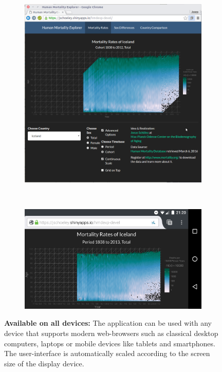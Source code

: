 \documentclass[
  12pt
]{scrartcl}
\begin{document}
\begin{figure}[!htb]
  \begin{subfigure}[t]{0.5\textwidth}
    \centering
    \includegraphics[width = \textwidth]{./fig/hmd_screen_wide.png}
    \label{fig:mx_wide}
    \end{subfigure}%
  ~
    \begin{subfigure}[t]{0.5\textwidth}
    \includegraphics[width = \textwidth]{./fig/hmd_screen_phone.png}
    \label{fig:mx_long}
    \end{subfigure}%
    \caption*{\textbf{Available on all devices:} The application can be used with any device that supports modern web-browsers such as classical desktop computers, laptops or mobile devices like tablets and smartphones. The user-interface is automatically scaled according to the screen size of the display device.}
    \label{fig:size}
\end{figure}
\end{document}
